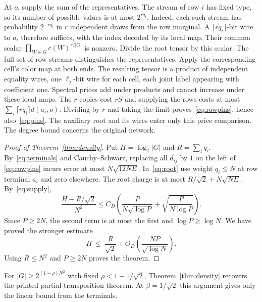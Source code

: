 \documentclass[11pt]{article}
\begin{document}
At $o$, supply the sum of the representatives. The stream of row $i$
has fixed type, so its number of possible values is at most $2^{rq_i}$.
Indeed, each such stream has probability $2^{-rq_i}$ in $r$ independent
draws from the row marginal. A $\lceil rq_i\rceil$-bit wire to $a_i$
therefore suffices, with the index decoded by its local map.
Their common scalar $\prod_{W\in G}c(W)^{r/|G|}$ is nonzero.
Divide the root tensor by this scalar.
The full set of row streams distinguishes the representatives. Apply
the corresponding cell's color map at both ends. The resulting tensor
is a product of independent equality wires, one $\ell_j$-bit wire for
each cell, each joint label appearing with coefficient one. Spectral
prices add under products and cannot increase under these local maps.
The $r$ copies cost $rS$ and supplying the rows costs at most
$\sum_i\lceil rq_i\rceil d(a_i,o)$. Dividing by $r$ and taking the
limit proves~\eqref{eq:rowpins}, hence also~\eqref{eq:pins}.
The auxiliary root and its wires enter only this
price comparison. The degree bound concerns the original network.

\begin{proof}[Proof of Theorem~\ref{thm:density}]
Put $H=\log_2|G|$ and $R=\sum_i q_i$. By~\eqref{eq:terminals} and
Cauchy--Schwarz, replacing all $d_{ij}$ by $1$ on the left of
\eqref{eq:rowpins} incurs error at most $N\sqrt{12NE}$.
In~\eqref{eq:root} use weight $q_i\le N$ at row terminal $a_i$ and
zero elsewhere. The root charge is at most $R/\sqrt2+N\sqrt{NE}$.
By~\eqref{eq:supply},
\[
  \frac{H-R/\sqrt2}{N^2}
     \le C_D\left(\frac{P}{N\sqrt{\log P}}
                   +\sqrt{\frac{P}{N\log P}}\right).
\]
Since $P\ge2N$, the second term is at most the first and
$\log P\ge\log N$. We have proved the stronger estimate
\begin{equation}\label{eq:rowgain}
 H\ \le\ \frac{R}{\sqrt2}+O_D\!\left(\frac{NP}{\sqrt{\log N}}\right).
\end{equation}
Using $R\le N^2$ and $P\ge2N$ proves the theorem.
\end{proof}

For $|G|\ge 2^{(1-\rho)N^2}$ with fixed
$\rho<1-1/\sqrt2$, Theorem~\ref{thm:density} recovers the printed
partial-transposition theorem. At $\beta=1/\sqrt2$ this argument
gives only the linear bound from the terminals.
\end{document}

